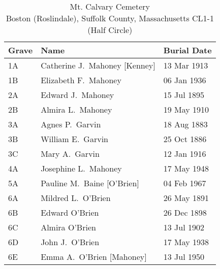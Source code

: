 \begin{table}[ht]
	\centering
	\caption{Mt. Calvary Cemetery\cite{John3OBrienBurial} \\
		Boston (Roslindale), Suffolk County, Massachusetts
		CL1-1 (Half Circle)}
	\begin{tabular}{|l|l|l|}
		\hline
		\textbf{Grave} & \textbf{Name} & \textbf{Burial Date} \\
		\hline
		1A & Catherine J.\ Mahoney [Kenney]\index{Kenney!Catherine Josephine}\index{Mahoney/Mahony!Catherine Josephine (Kenney)} & 13 Mar 1913 \\
		\hline
		1B & Elizabeth F.\ Mahoney\index{Mahoney/Mahony!Elizabeth F.} & 06 Jan 1936 \\
		\hline
		2A & Edward J.\ Mahoney\index{Mahoney/Mahony!Edward} & 15 Jul 1895 \\
		\hline
		2B & Almira L.\ Mahoney\index{Mahoney/Mahony!Almira L.} & 19 May 1910 \\
		\hline
		3A & Agnes P.\ Garvin\index{Garvin!Agnes P.} & 18 Aug 1883 \\
		\hline
		3B & William E.\ Garvin\index{Garvin!William E.} & 25 Oct 1886 \\
		\hline
		3C & Mary A.\ Garvin\index{Garvin!Mary A.} & 12 Jan 1916 \\
		\hline
		4A & Josephine L.\ Mahoney\index{Mahoney/Mahony!Josephine L.} & 17 May 1948 \\
		\hline
		5A & Pauline M.\ Baine [O'Brien]\index{O'Brien!Pauline M.\textsuperscript{4}}\index{Baine!Pauline M.\textsuperscript{4} (O'Brien)} & 04 Feb 1967 \\
		\hline
		6A & Mildred L.\ O'Brien\index{O'Brien!Mildred Loretta\textsuperscript{4}} & 26 May 1891 \\
		\hline
		6B & Edward O'Brien\index{O'Brien!Edward\textsuperscript{4} (1898--1898)} & 26 Dec 1898 \\
		\hline
		6C & Almira O'Brien\index{O'Brien!Almyra Louise\textsuperscript{4}} & 13 Jul 1902 \\
		\hline
		6D & John J.\ O'Brien\index{O'Brien!John Joseph\textsuperscript{3} (1861--1938)} & 17 May 1938 \\
		\hline
		6E & Emma A.\ O'Brien [Mahoney]\index{Mahoney/Mahony!Emma}\index{O'Brien!Emma (Mahony)} & 13 Jul 1950 \\
		\hline
	\end{tabular}
\end{table}

